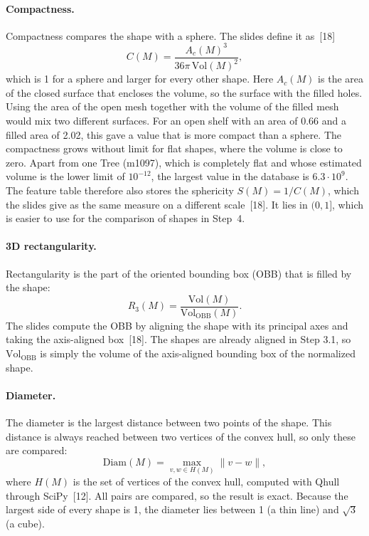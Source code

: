 \documentclass[10pt,a4paper]{article}
\begin{document}
\paragraph{Compactness.}
Compactness compares the shape with a sphere. The slides define it as~[18]
\begin{equation}
C(M) = \frac{A_c(M)^3}{36\pi\,\mathrm{Vol}(M)^2},
\label{eq:s32_compactness}
\end{equation}
which is 1 for a sphere and larger for every other shape. Here $A_c(M)$ is the area of the closed surface that encloses the
volume, so the surface with the filled holes. Using the area of the open mesh together with the volume of the filled mesh would
mix two different surfaces. For an open shelf with an area of 0.66 and a filled area of 2.02, this gave a value that is more
compact than a sphere. The compactness grows without limit for flat shapes, where the volume is close to zero. Apart from
one Tree (m1097), which is completely flat and whose estimated volume is the lower limit of $10^{-12}$, the largest value in
the database is $6.3\cdot10^{9}$. The feature table therefore also stores the sphericity $S(M)=1/C(M)$, which the slides give as the same
measure on a different scale~[18]. It lies in $(0,1]$, which is easier to use for the comparison of shapes in Step~4.

\paragraph{3D rectangularity.}
Rectangularity is the part of the oriented bounding box (OBB) that is filled by the shape:
\begin{equation}
R_3(M) = \frac{\mathrm{Vol}(M)}{\mathrm{Vol}_{\mathrm{OBB}}(M)}.
\label{eq:s32_rectangularity}
\end{equation}
The slides compute the OBB by aligning the shape with its principal axes and taking the axis-aligned box~[18]. The shapes are
already aligned in Step 3.1, so $\mathrm{Vol}_{\mathrm{OBB}}$ is simply the volume of the axis-aligned bounding box of the
normalized shape.

\paragraph{Diameter.}
The diameter is the largest distance between two points of the shape. This distance is always reached between two vertices of
the convex hull, so only these are compared:
\begin{equation}
\mathrm{Diam}(M) = \max_{v,w \in H(M)} \lVert v-w\rVert,
\label{eq:s32_diameter}
\end{equation}
where $H(M)$ is the set of vertices of the convex hull, computed with Qhull through SciPy~[12]. All pairs are compared, so the
result is exact. Because the largest side of every shape is 1, the diameter lies between 1 (a thin line) and $\sqrt3$ (a cube).
\end{document}
